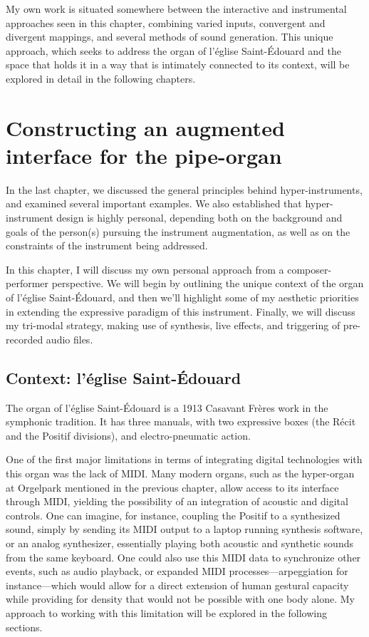 \documentclass[12pt,twoside,maitrise]{dms_ks}
\theoremstyle{definition}
\begin{document}
{My own work is situated somewhere between the interactive and instrumental approaches seen in this chapter, combining varied inputs, convergent and divergent mappings, and several methods of sound generation.
This unique approach, which seeks to address the organ of l'église Saint-Édouard and the space that holds it in a way that is intimately connected to its context, will be explored in detail in the following chapters. 

\chapter{Constructing an augmented interface for the pipe-organ}

In the last chapter, we discussed the general principles behind hyper-instruments, and examined several important examples. 
We also established that hyper-instrument design is highly personal, depending both on the background and goals of the person(s) pursuing the instrument augmentation, as well as on the constraints of the instrument being addressed. 

In this chapter, I will discuss my own personal approach from a composer-performer perspective. We will begin by outlining the unique context of the organ of l'église Saint-Édouard, and then we'll highlight some of my aesthetic priorities in extending the expressive paradigm of this instrument. Finally, we will discuss my tri-modal strategy, making use of synthesis, live effects, and triggering of pre-recorded audio files. 

\section{Context: l'église Saint-Édouard}

The organ of l'église Saint-Édouard is a 1913 Casavant Frères work in the symphonic tradition. 
It has three manuals, with two expressive boxes (the Récit and the Positif divisions), and electro-pneumatic action. 

One of the first major limitations in terms of integrating digital technologies with this organ was the lack of MIDI. 
Many modern organs, such as the hyper-organ at Orgelpark mentioned in the previous chapter, allow access to its interface through MIDI, yielding the possibility of an integration of acoustic and digital controls. 
One can imagine, for instance, coupling the Positif to a synthesized sound, simply by sending its MIDI output to a laptop running synthesis software, or an analog synthesizer, essentially playing both acoustic and synthetic sounds from the same keyboard. 
One could also use this MIDI data to synchronize other events, such as audio playback, or expanded MIDI processes---arpeggiation for instance---which would allow for a direct extension of human gestural capacity while providing for density that would not be possible with one body alone.
My approach to working with this limitation will be explored in the following sections.

}
\end{document}
